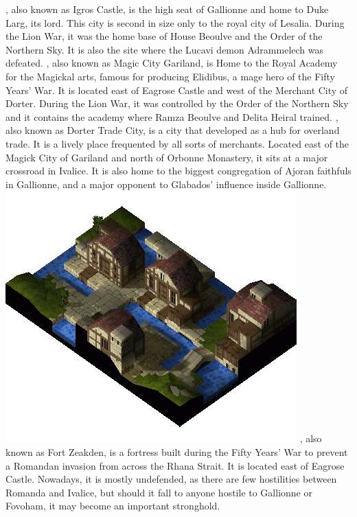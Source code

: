 \vfill
%
, also known as Igros Castle, is the high seat of Gallionne and home to Duke Larg, its lord. 
This city is second in size only to the royal city of Lesalia. 
During the Lion War, it was the home base of House Beoulve and the Order of the Northern Sky.
It is also the site where the Lucavi demon Adrammelech was defeated.
, also known as Magic City Gariland, is Home to the Royal Academy for the Magickal arts, famous for producing Elidibus, a mage hero of the Fifty Years' War. 
It is located east of Eagrose Castle and west of the Merchant City of Dorter. 
During the Lion War, it was controlled by the Order of the Northern Sky and it contains the academy where Ramza Beoulve and Delita Heiral trained.
, also known as Dorter Trade City, is a city that developed as a hub for overland trade. 
It is a lively place frequented by all sorts of merchants. 
Located east of the Magick City of Gariland and north of Orbonne Monastery, it sits at a major crossroad in Ivalice. 
It is also home to the biggest congregation of Ajoran faithfuls in Gallionne, and a major opponent to Glabados' influence inside Gallionne.
%
\newpage
\includegraphics[width=\columnwidth]{./art/worldbook/gariland.jpg}
\vfill
%
, also known as Fort Zeakden, is a fortress built during the Fifty Years' War to prevent a Romandan invasion from across the Rhana Strait. 
It is located east of Eagrose Castle. 
Nowadays, it is mostly undefended, as there are few hostilities between Romanda and Ivalice, but should it fall to anyone hostile to Gallionne or Fovoham, it may become an important stronghold.
